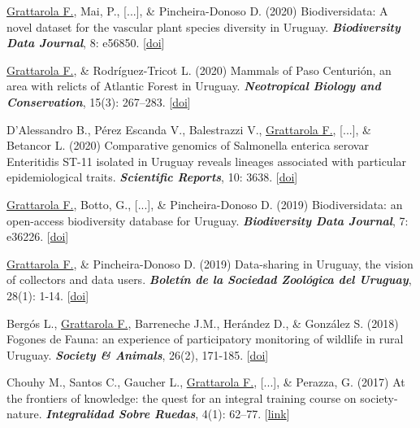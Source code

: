 \documentclass[9pt]{developercv} %
\begin{document}
\begin{etaremune}
\item \underline{Grattarola F.}, Mai, P., [...], \& Pincheira-Donoso D. (2020) Biodiversidata: A novel dataset for the vascular plant species diversity in Uruguay. \textit{\textbf{Biodiversity Data Journal}}, 8: e56850. [\href{https://doi.org/10.3897/BDJ.8.e56850}{doi}]

\item \underline{Grattarola F.}, \& Rodríguez-Tricot L. (2020) Mammals of Paso Centurión, an area with relicts of Atlantic Forest in Uruguay. \textit{\textbf{Neotropical Biology and Conservation}}, 15(3): 267–283. [\href{https://doi.org/10.3897/neotropical.15.e53062}{doi}]

\item D’Alessandro B., Pérez Escanda V., Balestrazzi V., \underline{Grattarola F.}, [...], \& Betancor L.  (2020) Comparative genomics of Salmonella enterica serovar Enteritidis ST-11 isolated in Uruguay reveals lineages associated with particular epidemiological traits. \textit{\textbf{Scientific Reports}}, 10: 3638. [\href{https://doi.org/10.1038/s41598-020-60502-8}{doi}]

\item \underline{Grattarola F.}, Botto, G., [...], \& Pincheira-Donoso D. (2019) Biodiversidata: an open-access biodiversity database for Uruguay. \textit{\textbf{Biodiversity Data Journal}}, 7: e36226. [\href{https://doi.org/10.3897/BDJ.7.e36226}{doi}]

\item \underline{Grattarola F.}, \& Pincheira-Donoso D. (2019) Data-sharing in Uruguay, the vision of collectors and data users. \textit{\textbf{Boletín de la Sociedad Zoológica del Uruguay}}, 28(1): 1-14. [\href{https://doi.org/10.26462/28.1.1}{doi}]

\item Bergós L., \underline{Grattarola F.}, Barreneche J.M., Herández D., \& González S. (2018) Fogones de Fauna: an experience of participatory monitoring of wildlife in rural Uruguay. \textit{\textbf{Society \& Animals}}, 26(2), 171-185. [\href{https://doi.org/10.1163/15685306-12341497}{doi}]

\item Chouhy M., Santos C., Gaucher L., \underline{Grattarola F.}, [...], \& Perazza, G. (2017) At the frontiers of knowledge: the quest for an integral training course on society-nature. \textit{\textbf{Integralidad Sobre Ruedas}}, 4(1): 62–77. [\href{https://ojs.fhce.edu.uy/index.php/insoru/article/view/234}{link}]


\end{etaremune}
\end{document}
